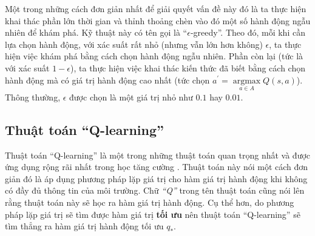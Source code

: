 Một trong những cách đơn giản nhất để giải quyết vấn đề này đó là ta thực hiện khai thác phần lớn thời gian và thỉnh thoảng chèn vào đó một số hành động ngẫu nhiên để khám phá.
Kỹ thuật này có tên gọi là ``$\epsilon$-greedy''.
Theo đó, mỗi khi cần lựa chọn hành động, với xác suất rất nhỏ (nhưng vẫn lớn hơn không) $\epsilon$, ta thực hiện việc khám phá bằng cách chọn hành động ngẫu nhiên.
Phần còn lại (tức là với xác suất $1 - \epsilon$), ta thực hiện việc khai thác kiến thức đã biết bằng cách chọn hành động mà có giá trị hành động cao nhất (tức chọn $a^{'} = \underset{a \in A}{\operatorname{argmax}}Q(s,a)$).
Thông thường, $\epsilon$ được chọn là một giá trị nhỏ như $0.1$ hay $0.01$.

\subsection{Thuật toán ``Q-learning''}
Thuật toán ``Q-learning'' là một trong những thuật toán quan trọng nhất và được ứng dụng rộng rãi nhất trong học tăng cường \cite{sutton1998introduction}.
Thuật toán này nói một cách đơn giản đó là áp dụng phương pháp lặp giá trị cho hàm giá trị hành động khi không có đầy đủ thông tin của môi trường.
Chữ \textit{``Q''} trong tên thuật toán cũng nói lên rằng thuật toán này sẽ học ra hàm giá trị hành động.
Cụ thể hơn, do phương pháp lặp giá trị sẽ tìm được hàm giá trị \textbf{tối ưu} nên thuật toán ``Q-learning'' sẽ tìm thẳng ra hàm giá trị hành động tối ưu $q_*$.

